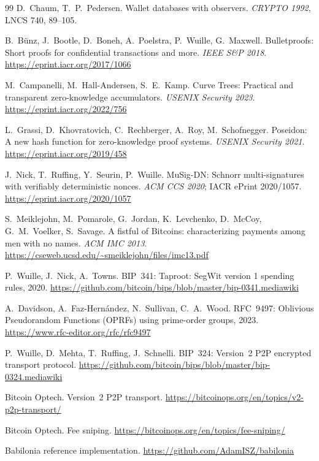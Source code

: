 \documentclass[11pt]{article}
\begin{document}
\begin{thebibliography}{99}
 D.~Chaum, T.~P.~Pedersen. Wallet databases with observers. \emph{CRYPTO 1992}, LNCS 740, 89--105.

 B.~B\"unz, J.~Bootle, D.~Boneh, A.~Poelstra, P.~Wuille, G.~Maxwell. Bulletproofs: Short proofs for confidential transactions and more. \emph{IEEE S\&P 2018}. \url{https://eprint.iacr.org/2017/1066}

 M.~Campanelli, M.~Hall-Andersen, S.~E.~Kamp. Curve Trees: Practical and transparent zero-knowledge accumulators. \emph{USENIX Security 2023}. \url{https://eprint.iacr.org/2022/756}

 L.~Grassi, D.~Khovratovich, C.~Rechberger, A.~Roy, M.~Schofnegger. Poseidon: A new hash function for zero-knowledge proof systems. \emph{USENIX Security 2021}. \url{https://eprint.iacr.org/2019/458}

 J.~Nick, T.~Ruffing, Y.~Seurin, P.~Wuille. MuSig-DN: Schnorr multi-signatures with verifiably deterministic nonces. \emph{ACM CCS 2020}; IACR ePrint 2020/1057. \url{https://eprint.iacr.org/2020/1057}

 S.~Meiklejohn, M.~Pomarole, G.~Jordan, K.~Levchenko, D.~McCoy, G.~M.~Voelker, S.~Savage. A fistful of Bitcoins: characterizing payments among men with no names. \emph{ACM IMC 2013}. \url{https://cseweb.ucsd.edu/~smeiklejohn/files/imc13.pdf}

 P.~Wuille, J.~Nick, A.~Towns. BIP~341: Taproot: SegWit version 1 spending rules, 2020. \url{https://github.com/bitcoin/bips/blob/master/bip-0341.mediawiki}

 A.~Davidson, A.~Faz-Hern\'andez, N.~Sullivan, C.~A.~Wood. RFC~9497: Oblivious Pseudorandom Functions (OPRFs) using prime-order groups, 2023. \url{https://www.rfc-editor.org/rfc/rfc9497}

 P.~Wuille, D.~Mehta, T.~Ruffing, J.~Schnelli. BIP~324: Version~2 P2P encrypted transport protocol. \url{https://github.com/bitcoin/bips/blob/master/bip-0324.mediawiki}

 Bitcoin Optech. Version~2 P2P transport. \url{https://bitcoinops.org/en/topics/v2-p2p-transport/}

 Bitcoin Optech. Fee sniping. \url{https://bitcoinops.org/en/topics/fee-sniping/}

 Babilonia reference implementation. \url{https://github.com/AdamISZ/babilonia}


\end{thebibliography}
\end{document}
